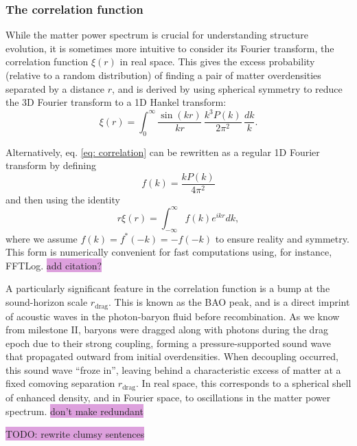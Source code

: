 \documentclass{aa}
\numberwithin{equation}{section}
\numberwithin{table}{section}
\numberwithin{figure}{section}
\begin{document}
\subsubsection{The correlation function}
While the matter power spectrum is crucial for understanding structure evolution, it is sometimes more intuitive to consider its Fourier transform, the correlation function $\xi(r)$ in real space. This gives the excess probability (relative to a random distribution) of finding a pair of matter overdensities separated by a distance $r$, and is derived by using spherical symmetry to reduce the 3D Fourier transform to a 1D Hankel transform:
\begin{equation}
\xi(r) = \int_0^\infty \frac{\sin(kr)}{kr} \, \frac{k^3 P(k)}{2\pi^2} \, \frac{dk}{k}. \label{eq: correlation}
\end{equation}

Alternatively, eq. \eqref{eq: correlation} can be rewritten as a regular 1D Fourier transform by defining
\begin{equation}
f(k) = \frac{kP(k)}{4\pi^2}
\end{equation}
and then using the identity
\begin{equation}
r\xi(r) = \int_{-\infty}^{\infty} f(k) e^{ikr} dk,
\end{equation}
where we assume $f(k) = f^*(-k) = -f(-k)$ to ensure reality and symmetry. This form is numerically convenient for fast computations using, for instance, FFTLog. \colorbox{Plum}{add citation?}

A particularly significant feature in the correlation function is a bump at the sound-horizon scale $r_\text{drag}$. This is known as the BAO peak, and is a direct imprint of acoustic waves in the photon-baryon fluid before recombination. As we know from milestone II, baryons were dragged along with photons during the drag epoch due to their strong coupling, forming a pressure-supported sound wave that propagated outward from initial overdensities. When decoupling occurred, this sound wave ``froze in'', leaving behind a characteristic excess of matter at a fixed comoving separation $r_\text{drag}$. In real space, this corresponds to a spherical shell of enhanced density, and in Fourier space, to oscillations in the matter power spectrum. \colorbox{Plum}{don't make redundant}

\colorbox{Plum}{TODO: rewrite clumsy sentences}

\end{document}
